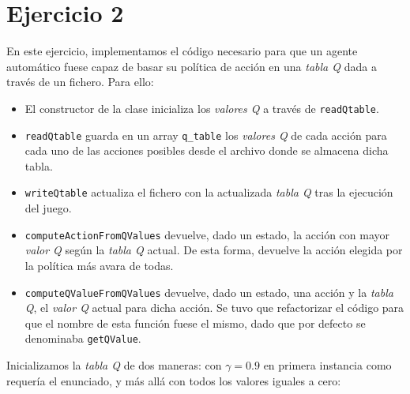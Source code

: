 \documentclass[12pt]{article}
\begin{document}


\newpage
\section{Ejercicio 2}

En este ejercicio, implementamos el código necesario para que un agente automático fuese capaz de basar su política de acción en una \textit{tabla Q} dada a través de un fichero. Para ello:

\begin{itemize}
    \item El constructor de la clase inicializa los \textit{valores Q} a través de \texttt{readQtable}.
    \item \texttt{readQtable} guarda en un array \texttt{q\_table} los \textit{valores Q} de cada acción para cada uno de las acciones posibles desde el archivo donde se almacena dicha tabla.
    \item \texttt{writeQtable} actualiza el fichero con la actualizada \textit{tabla Q} tras la ejecución del juego.
    \item \texttt{computeActionFromQValues} devuelve, dado un estado, la acción con mayor \textit{valor Q} según la \textit{tabla Q} actual. De esta forma, devuelve la acción elegida por la política más avara de todas.
    \item \texttt{computeQValueFromQValues} devuelve, dado un estado, una acción y la \textit{tabla Q}, el \textit{valor Q} actual para dicha acción. Se tuvo que refactorizar el código para que el nombre de esta función fuese el mismo, dado que por defecto se denominaba \texttt{getQValue}.
\end{itemize}

Inicializamos la \textit{tabla Q} de dos maneras: con $\gamma = 0.9$ en primera instancia como requería el enunciado, y más allá con todos los valores iguales a cero: \\
\end{document}
